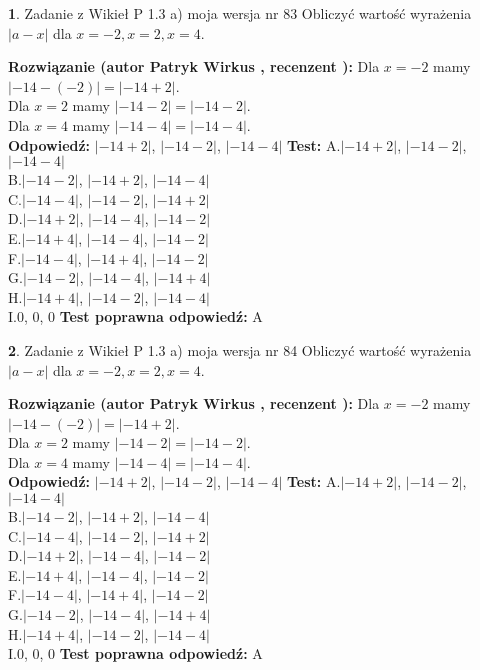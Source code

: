 \documentclass[12pt, a4paper]{article}
\theoremstyle{definition} %
\newtheorem{zad}{}
\newcommand{\zadStart}[1]{\begin{zad}#1\newline}
\newcommand{\zadStop}{\end{zad}}
\newcommand{\rozwStart}[2]{\noindent \textbf{Rozwiązanie (autor #1 , recenzent #2): }\newline}
\newcommand{\rozwStop}{\newline}
\newcommand{\odpStart}{\noindent \textbf{Odpowiedź:}\newline}
\newcommand{\odpStop}{\newline}
\newcommand{\testStart}{\noindent \textbf{Test:}\newline}
\newcommand{\testStop}{\newline}
\newcommand{\kluczStart}{\noindent \textbf{Test poprawna odpowiedź:}\newline}
\newcommand{\kluczStop}{\newline}
\begin{document}
\zadStart{Zadanie z Wikieł P 1.3 a) moja wersja nr 83}
Obliczyć wartość wyrażenia $|a - x|$ dla $x=-2,x=2,x=4$.
\zadStop
\rozwStart{Patryk Wirkus}{}
Dla $x = -2$ mamy $|-14 - (-2)| = |-14 + 2|$.\\
Dla $x = 2$ mamy $|-14 - 2| = |-14 - 2|$.\\
Dla $x = 4$ mamy $|-14 - 4| = |-14 - 4|$.\\
\rozwStop
\odpStart
$|-14 + 2|$, $|-14 - 2|$, $|-14 - 4|$
\odpStop
\testStart
A.$|-14 + 2|$, $|-14 - 2|$, $|-14 - 4|$\\
B.$|-14 - 2|$, $|-14 + 2|$, $|-14 - 4|$\\
C.$|-14 - 4|$, $|-14 - 2|$, $|-14 + 2|$\\
D.$|-14 + 2|$, $|-14 - 4|$, $|-14 - 2|$\\
E.$|-14 + 4|$, $|-14 - 4|$, $|-14 - 2|$\\
F.$|-14 - 4|$, $|-14 + 4|$, $|-14 - 2|$\\
G.$|-14 - 2|$, $|-14 - 4|$, $|-14 + 4|$\\
H.$|-14 + 4|$, $|-14 - 2|$, $|-14 - 4|$\\
I.$0$, $0$, $0$
\testStop
\kluczStart
A
\kluczStop



\zadStart{Zadanie z Wikieł P 1.3 a) moja wersja nr 84}
Obliczyć wartość wyrażenia $|a - x|$ dla $x=-2,x=2,x=4$.
\zadStop
\rozwStart{Patryk Wirkus}{}
Dla $x = -2$ mamy $|-14 - (-2)| = |-14 + 2|$.\\
Dla $x = 2$ mamy $|-14 - 2| = |-14 - 2|$.\\
Dla $x = 4$ mamy $|-14 - 4| = |-14 - 4|$.\\
\rozwStop
\odpStart
$|-14 + 2|$, $|-14 - 2|$, $|-14 - 4|$
\odpStop
\testStart
A.$|-14 + 2|$, $|-14 - 2|$, $|-14 - 4|$\\
B.$|-14 - 2|$, $|-14 + 2|$, $|-14 - 4|$\\
C.$|-14 - 4|$, $|-14 - 2|$, $|-14 + 2|$\\
D.$|-14 + 2|$, $|-14 - 4|$, $|-14 - 2|$\\
E.$|-14 + 4|$, $|-14 - 4|$, $|-14 - 2|$\\
F.$|-14 - 4|$, $|-14 + 4|$, $|-14 - 2|$\\
G.$|-14 - 2|$, $|-14 - 4|$, $|-14 + 4|$\\
H.$|-14 + 4|$, $|-14 - 2|$, $|-14 - 4|$\\
I.$0$, $0$, $0$
\testStop
\kluczStart
A
\kluczStop
\end{document}
